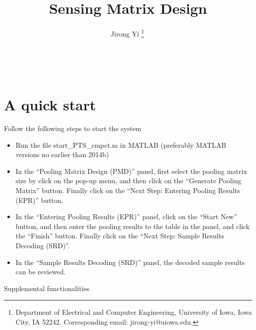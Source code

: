 \documentclass{article}
\theoremstyle{remark}
\begin{document}
\title{Sensing Matrix Design}

\author{
Jirong Yi {\footnote{
Department of Electrical and Computer Engineering, University of Iowa, Iowa City, IA 52242. Corresponding email: jirong-yi@uiowa.edu.}}\,}\,



\maketitle

\section{A quick start}\label{Sec:QuickStart}

Follow the following steps to start the system

\begin{itemize}
\item Run the file start\_PTS\_cmpct.m in MATLAB (preferably MATLAB versions no earlier than 2014b)

\item In the ``Pooling Matrix Design (PMD)'' panel, first select the pooling matrix size by click on the pop-up menu, and then click on the ``Generate Pooling Matrix'' button. Finally click on the ``Next Step: Entering Pooling Results (EPR)'' button. 

\item In the ``Entering Pooling Results (EPR)'' panel, click on the ``Start New'' button, and then enter the pooling results to the table in the panel, and click the ``Finish'' button. Finally click on the ``Next Step: Sample Results Decoding (SRD)''. 

\item In the ``Sample Results Decoding (SRD)'' panel, the decoded sample results can be reviewed. 
\end{itemize}

Supplemental functionalities
\end{document}
